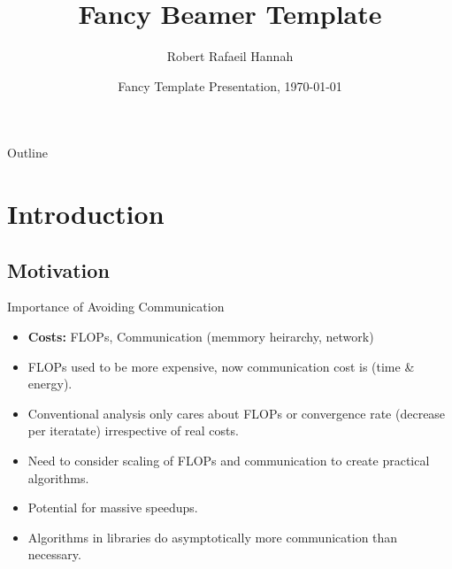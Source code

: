 \documentclass[english]{beamer}
\begin{document}

\title[Communication-Avoiding Algorithms]{Fancy Beamer Template}


\author{Robert Rafaeil Hannah}



\date{Fancy Template Presentation, \today}

\begin{frame}{}
\titlepage

\end{frame}

\begin{frame}{Outline}
\tableofcontents{}

\end{frame}

\section{Introduction}

\subsection{Motivation}

\begin{frame}{Importance of Avoiding Communication}

\begin{itemize}
\item \textbf{Costs:} FLOPs, Communication (memmory heirarchy, network)
\item FLOPs used to be more expensive, now communication cost is (time \&
energy).
\item Conventional analysis only cares about FLOPs or convergence rate (decrease
per iteratate) irrespective of real costs.
\item Need to consider scaling of FLOPs and communication to create practical
algorithms.
\item Potential for massive speedups.
\item Algorithms in libraries do asymptotically more communication than
necessary.
\end{itemize}
\end{frame}
\end{document}
